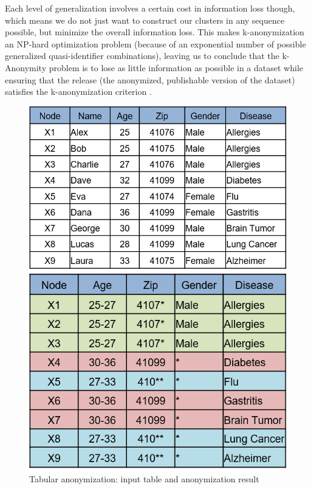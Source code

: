 	
	Each level of generalization involves a certain cost in information loss though, which means we do not just want to construct our clusters in any sequence possible, but minimize the overall information loss. This makes k-anonymization an NP-hard optimization problem (because of an exponential number of possible generalized quasi-identifier combinations), leaving us to conclude that the k-Anonymity problem is to lose as little information as possible in a dataset while ensuring that the release (the anonymized, publishable version of the dataset) satisfies the k-anonymization criterion \citep{aggarwal2005approximation}.
	
	\begin{figure}[H]
		\centering
		\begin{minipage}[b]{0.5\textwidth}
			\includegraphics[width=\textwidth]{figures/anonym/k_anon_input}
		\end{minipage}
		\hfill
		\begin{minipage}[b]{0.418\textwidth}
			\includegraphics[width=\textwidth]{figures/anonym/k_anon_output}
		\end{minipage}
		\caption{Tabular anonymization: input table and anonymization result}
		\label{fig:anonymized_clusters}
	\end{figure}
	
